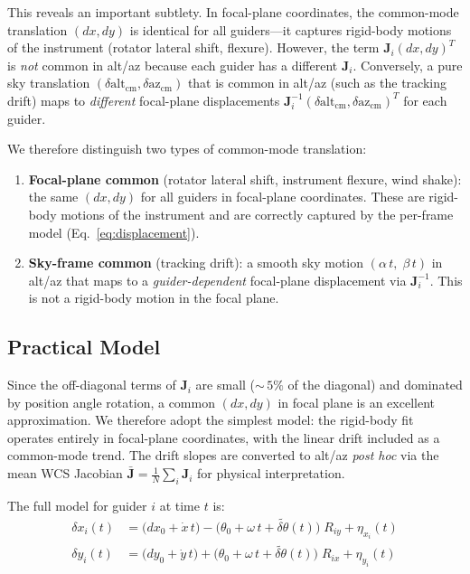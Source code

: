 \documentclass[SE,lsstdraft,authoryear,toc]{lsstdoc}
\newcommand{\Rix}{R_{ix}}
\newcommand{\Riy}{R_{iy}}
\begin{document}
\noindent
This reveals an important subtlety.  In focal-plane coordinates, the
common-mode translation $(dx, dy)$ is identical for all guiders---it
captures rigid-body motions of the instrument (rotator lateral shift,
flexure).  However, the term $\mathbf{J}_i(dx, dy)^T$ is \emph{not}
common in alt/az because each guider has a different $\mathbf{J}_i$.
Conversely, a pure sky translation
$(\delta\mathrm{alt}_{\mathrm{cm}}, \delta\mathrm{az}_{\mathrm{cm}})$
that is common in alt/az (such as the tracking drift) maps to
\emph{different} focal-plane displacements
$\mathbf{J}_i^{-1}(\delta\mathrm{alt}_{\mathrm{cm}},
\delta\mathrm{az}_{\mathrm{cm}})^T$ for each guider.

We therefore distinguish two types of common-mode translation:
\begin{enumerate}
\item \textbf{Focal-plane common} (rotator lateral shift, instrument
  flexure, wind shake): the same $(dx, dy)$ for all guiders in
  focal-plane coordinates.  These are rigid-body motions of the
  instrument and are correctly captured by the per-frame model
  (Eq.~\ref{eq:displacement}).

\item \textbf{Sky-frame common} (tracking drift): a smooth sky motion
  $(\alpha\,t,\; \beta\,t)$ in alt/az that maps to a
  \emph{guider-dependent} focal-plane displacement via
  $\mathbf{J}_i^{-1}$.  This is not a rigid-body motion in the focal
  plane.
\end{enumerate}

\subsection{Practical Model}
\label{sec:practical_model}

Since the off-diagonal terms of $\mathbf{J}_i$ are small
(${\sim}\,5\%$ of the diagonal) and dominated by position angle
rotation, a common $(dx, dy)$ in focal plane is an excellent
approximation.  We therefore adopt the simplest model: the rigid-body
fit operates entirely in focal-plane coordinates,
with the linear drift included as a common-mode trend.  The drift
slopes are converted to alt/az \emph{post hoc} via the mean WCS
Jacobian $\bar{\mathbf{J}} = \frac{1}{N}\sum_i \mathbf{J}_i$ for
physical interpretation.

The full model for guider $i$ at time $t$ is:
\begin{equation}
\boxed{
\begin{aligned}
\delta x_i(t) &= \bigl(dx_0 + \dot{x}\,t\bigr)
  - \bigl(\theta_0 + \omega\,t + \widetilde{\delta\theta}(t)\bigr)\;\Riy
  + \eta_{x_i}(t) \\[4pt]
\delta y_i(t) &= \bigl(dy_0 + \dot{y}\,t\bigr)
  + \bigl(\theta_0 + \omega\,t + \widetilde{\delta\theta}(t)\bigr)\;\Rix
  + \eta_{y_i}(t)
\end{aligned}
}
\label{eq:practical_model}
\end{equation}
\end{document}
